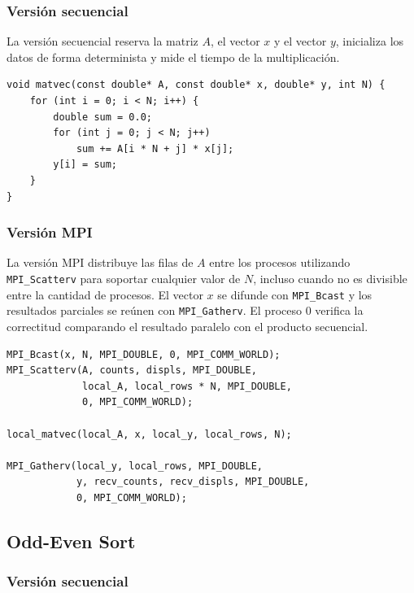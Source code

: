 \documentclass[12pt,a4paper]{article}
\begin{document}
\subsubsection{Versión secuencial}

La versión secuencial reserva la matriz $A$, el vector $x$ y el vector $y$, inicializa los datos de forma determinista y mide el tiempo de la multiplicación.

\begin{lstlisting}[caption=Fragmento de la versión secuencial]
void matvec(const double* A, const double* x, double* y, int N) {
    for (int i = 0; i < N; i++) {
        double sum = 0.0;
        for (int j = 0; j < N; j++)
            sum += A[i * N + j] * x[j];
        y[i] = sum;
    }
}
\end{lstlisting}

\subsubsection{Versión MPI}

La versión MPI distribuye las filas de $A$ entre los procesos utilizando \texttt{MPI\_Scatterv} para soportar cualquier valor de $N$, incluso cuando no es divisible entre la cantidad de procesos. El vector $x$ se difunde con \texttt{MPI\_Bcast} y los resultados parciales se reúnen con \texttt{MPI\_Gatherv}. El proceso 0 verifica la correctitud comparando el resultado paralelo con el producto secuencial.

\begin{lstlisting}[caption=Fragmento de la versión MPI]
MPI_Bcast(x, N, MPI_DOUBLE, 0, MPI_COMM_WORLD);
MPI_Scatterv(A, counts, displs, MPI_DOUBLE,
             local_A, local_rows * N, MPI_DOUBLE,
             0, MPI_COMM_WORLD);

local_matvec(local_A, x, local_y, local_rows, N);

MPI_Gatherv(local_y, local_rows, MPI_DOUBLE,
            y, recv_counts, recv_displs, MPI_DOUBLE,
            0, MPI_COMM_WORLD);
\end{lstlisting}

\subsection{Odd-Even Sort}

\subsubsection{Versión secuencial}
\end{document}
